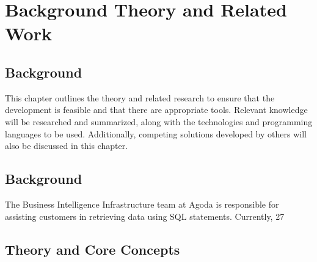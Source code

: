 \chapter{Background Theory and Related Work}






\section{Background}
This chapter outlines the theory and related research to ensure that the development is feasible and that there are appropriate tools. Relevant knowledge will be researched and summarized, along with the technologies and programming languages to be used. Additionally, competing solutions developed by others will also be discussed in this chapter.

\section{Background}
The Business Intelligence Infrastructure team at Agoda is responsible for assisting customers in retrieving data using SQL statements. Currently, 27%
\section{Theory and Core Concepts}
